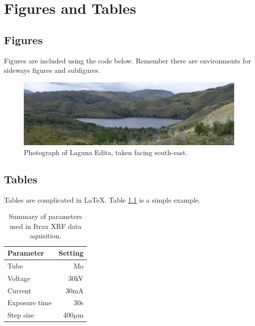 \chapter{Figures and Tables}
\section{Figures}
Figures are included using the code below. Remember there are environments for sideways figures and subfigures. 

\begin{figure}[tbp]
	\centering
		\includegraphics[width=1.00\textwidth]{edita.jpg}
	\caption[Photograph of Laguna Edita.]{Photograph of Laguna Edita, taken facing south-east.}
	\label{fig:editapic}
\end{figure}

\section{Tables}
Tables are complicated in \LaTeX. Table \ref{tab:itraxsetupsummary} is a simple example.

\begin{table}[tbp]
	\centering
		\begin{tabular}{lr}
		 \hline
		 Parameter     & Setting       \\ \hline
		 Tube          & Mo            \\
		 Voltage       & 30kV          \\
		 Current       & 30mA          \\
	   Exposure time & 30s           \\
		 Step size     & 400$\mu$m     \\
		 \hline			
		\end{tabular}
	\caption[Summary of parameters used in Itrax XRF data aquisition.]{Summary of parameters used in Itrax XRF data aquisition.}
	\label{tab:itraxsetupsummary}
\end{table}